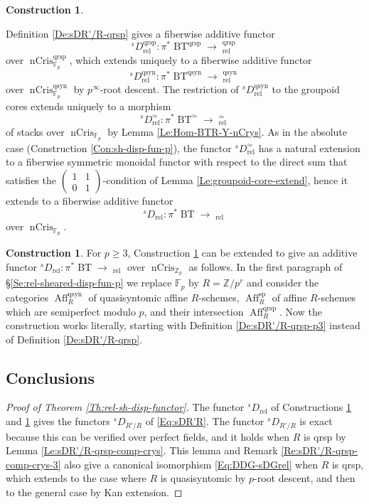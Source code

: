\documentclass[a4paper,11pt]{amsart}
\theoremstyle{plain}
\theoremstyle{definition}
\newtheorem{Const}[equation]{Construction}
\theoremstyle{remark}
\newcommand{\bCon}{\begin{Const}}
\newcommand{\eCon}{\end{Const}}
\newcommand{\bproof}{\begin{proof}}
\newcommand{\eproof}{\end{proof}}
\numberwithin{equation}{section}
\newcommand{\FF}{{\mathbb{F}}}
\newcommand{\ZZ}{{\mathbb{Z}}}
\DeclareMathOperator{\qrsp}{qrsp}
\DeclareMathOperator{\qsyn}{qsyn}
\DeclareMathOperator{\rel}{rel}
\DeclareMathOperator{\semiperf}{sp}
\DeclareMathOperator{\Aff}{Aff}
\DeclareMathOperator{\nCrys}{nCris}
\DeclareMathOperator{\BT}{BT}
\DeclareMathOperator{\sDisp}{{}^sDisp}
\newcommand{\sD}{{}^{s\!}D}
\begin{document}
\bCon 
\label{Con:sh-disp-fun-rel}

Definition \ref{De:sDR'/R-qrsp} gives a fiberwise additive functor 
\[
\sD_{\rel}^{\qrsp}\colon \pi^*\BT^{\qrsp}\to\sDisp_{\rel}^{\qrsp}
\]
over $\nCrys_{\FF_p}^{\qrsp}$,
which extends uniquely to a fiberwise additive functor 
\[
\sD_{\rel}^{\qsyn}\colon \pi^*\BT^{\qsyn}\to\sDisp_{\rel}^{\qsyn}
\]
over $\nCrys_{\FF_p}^{\qsyn}$ by $p^\infty$-root descent. The restriction of $\sD_{\rel}^{\qsyn}$ to the groupoid cores extends uniquely to a morphism
\[
\sD^\simeq_{\rel}\colon \pi^*\BT^\simeq\to \sDisp^\simeq_{\rel}
\]
of stacks over $\nCrys_{\FF_p}$ by Lemma \ref{Le:Hom-BTR-Y-nCrys}.
As in the absolute case (Construction \ref{Con:sh-disp-fun-p}), the functor $\sD^\simeq_{\rel}$ has a natural extension to a fiberwise symmetric monoidal functor with respect to the direct sum that satisfies the $\left(\begin{smallmatrix}1&1\\0&1\end{smallmatrix}\right)$-condition of Lemma \ref{Le:groupoid-core-extend}, hence it extends to a fiberwise additive functor
\[
\sD_{\rel}\colon \pi^*\BT\to\sDisp_{\rel}
\]
over $\nCrys_{\FF_p}$. 
\eCon

\bCon
\label{Con:sh-disp-fun-rel-3}
 For  $p\ge 3$, Construction \ref{Con:sh-disp-fun-rel} can be extended to give an additive functor $\sD_{\rel}\colon \pi^*\BT\to\sDisp_{\rel}$ over $\nCrys_{\ZZ_p}$ as follows. In the first paragraph of \S\ref{Se:rel-sheared-disp-fun-p} we replace $\FF_p$ by $R=\ZZ/p^r$ and consider the categories $\Aff_{R}^{\qsyn}$ of quasisyntomic affine $R$-schemes, $\Aff_{R}^{\semiperf}$ of affine $R$-schemes which are semiperfect modulo $p$, and their intersection $\Aff_{R}^{\qrsp}$. Now the construction works literally, starting with Definition \ref{De:sDR'/R-qrsp-p3} instead of Definition \ref{De:sDR'/R-qrsp}.
\eCon

\subsection{Conclusions}
\label{Se:Sheared-display-functor:conclusions}

\bproof[Proof of Theorem \ref{Th:rel-sh-disp-functor}]
The functor $\sD_{\rel}$ of Constructions \ref{Con:sh-disp-fun-rel} and \ref{Con:sh-disp-fun-rel-3} gives the functors $\sD_{R'/R}$ of \eqref{Eq:sDR'R}. The functor $\sD_{R'/R}$ is exact because this can be verified over perfect fields, and it holds when $R$ is qrsp by Lemma \ref{Le:sDR'/R-qrsp-comp-crys}. This lemma and Remark \ref{Re:sDR'/R-qrsp-comp-crys-3} also give a canonical isomorphism \eqref{Eq:DDG-sDGrel} when $R$ is qrsp, which extends to the case where $R$ is quasisyntomic by $p$-root descent, and then to the general case by Kan extension.
\eproof
\end{document}
